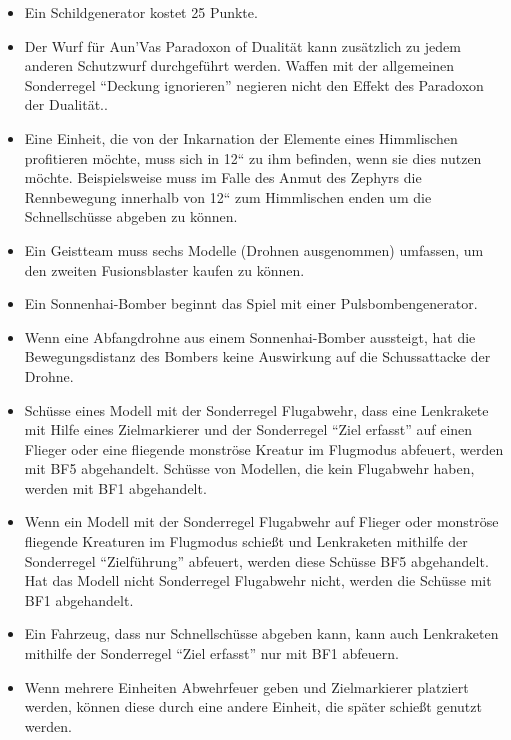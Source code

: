 \begin{itemize}

 \item Ein Schildgenerator kostet 25 Punkte.

 \item Der Wurf für Aun'Vas Paradoxon of Dualität kann zusätzlich zu jedem
  anderen Schutzwurf durchgeführt werden. Waffen mit der allgemeinen Sonderregel
  ``Deckung ignorieren'' negieren nicht den Effekt des Paradoxon der Dualität..

 \item Eine Einheit, die von der Inkarnation der Elemente eines Himmlischen
  profitieren möchte, muss sich in 12“ zu ihm befinden, wenn sie dies nutzen
  möchte.  Beispielsweise muss im Falle des Anmut des Zephyrs die Rennbewegung
  innerhalb von 12“ zum Himmlischen enden um die Schnellschüsse abgeben zu
  können.

 \item Ein Geistteam muss sechs Modelle (Drohnen ausgenommen) umfassen, um den
  zweiten Fusionsblaster kaufen zu können.

 \item Ein Sonnenhai-Bomber beginnt das Spiel mit einer Pulsbombengenerator.

 \item Wenn eine Abfangdrohne aus einem Sonnenhai-Bomber aussteigt, hat die
  Bewegungsdistanz des Bombers keine Auswirkung auf die Schussattacke der
  Drohne.

 \item Schüsse eines Modell mit der Sonderregel Flugabwehr, dass eine Lenkrakete
  mit Hilfe eines Zielmarkierer und der Sonderregel ``Ziel erfasst'' auf einen
  Flieger oder eine fliegende monströse Kreatur im Flugmodus abfeuert, werden
  mit BF5 abgehandelt.
Schüsse von Modellen, die kein Flugabwehr haben, werden mit BF1 abgehandelt.

 \item Wenn ein Modell mit der Sonderregel Flugabwehr auf Flieger oder monströse
  fliegende Kreaturen im Flugmodus schießt und Lenkraketen mithilfe der
  Sonderregel ``Zielführung'' abfeuert, werden diese Schüsse BF5 abgehandelt.  Hat
  das Modell nicht Sonderregel Flugabwehr nicht, werden die Schüsse mit BF1
  abgehandelt.

 \item Ein Fahrzeug, dass nur Schnellschüsse abgeben kann, kann auch Lenkraketen
  mithilfe der Sonderregel ``Ziel erfasst'' nur mit BF1 abfeuern.

 \item Wenn mehrere Einheiten Abwehrfeuer geben und Zielmarkierer platziert
  werden, können diese durch eine andere Einheit, die später schießt genutzt
  werden.


\end{itemize}
